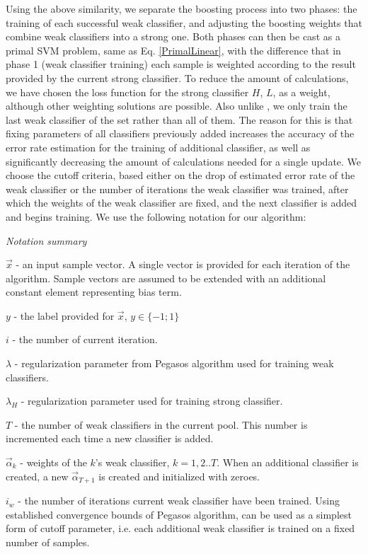\documentclass[10pt,twocolumn, a4paper]{article}
\begin{document}
Using the above similarity, we separate the boosting process into two phases: the training of each successful weak classifier, and adjusting the boosting weights that combine weak classifiers into a strong one. Both phases can then be cast as a primal SVM problem, same as Eq. \ref{PrimalLinear}, with the difference that in phase 1 (weak classifier training) each sample is weighted according to the result provided by the current strong classifier. To reduce the amount of calculations, we have chosen the loss function for the strong classifier $H$, $L$, as a weight, although other weighting solutions are possible. Also unlike \cite{OnlineBoost}, we only train the last weak classifier of the set rather than all of them. The reason for this is that fixing parameters of all classifiers previously added  increases the accuracy of the error rate estimation for the training of additional classifier,  as well as significantly decreasing the amount of calculations needed for a single update. We choose the cutoff criteria, based either on the drop of estimated error rate of the weak classifier or the number of iterations the weak classifier was trained, after which the weights of the weak classifier are fixed, and the next classifier is added and begins training.
We use the following notation for our algorithm:

\emph{Notation summary}

$\vec{x}$ - an input sample vector. A single vector is provided for each iteration of the algorithm. Sample vectors are assumed to be extended with an additional constant element representing bias term.

$y$ - the label provided for $\vec{x}$, $y \in \{-1;1\}$

$i$ - the number of current iteration.

$\lambda$ - regularization parameter from Pegasos algorithm used for training weak classifiers.

$\lambda_H$ - regularization parameter used for training strong classifier.

$T$ - the number of weak classifiers in the current pool. This number is incremented each time a new classifier is added.

$\vec{\alpha}_k$ - weights of the $k$'s weak classifier, $k=1,2..T$. When an additional classifier is created, a new $\vec{\alpha}_{T+1}$ is created and initialized with zeroes.

$i_w$ - the number of iterations current weak classifier have been trained. Using established convergence bounds of Pegasos algorithm, can be used as a simplest form of cutoff parameter, i.e. each additional weak classifier is trained on a fixed number of samples.
\end{document}
